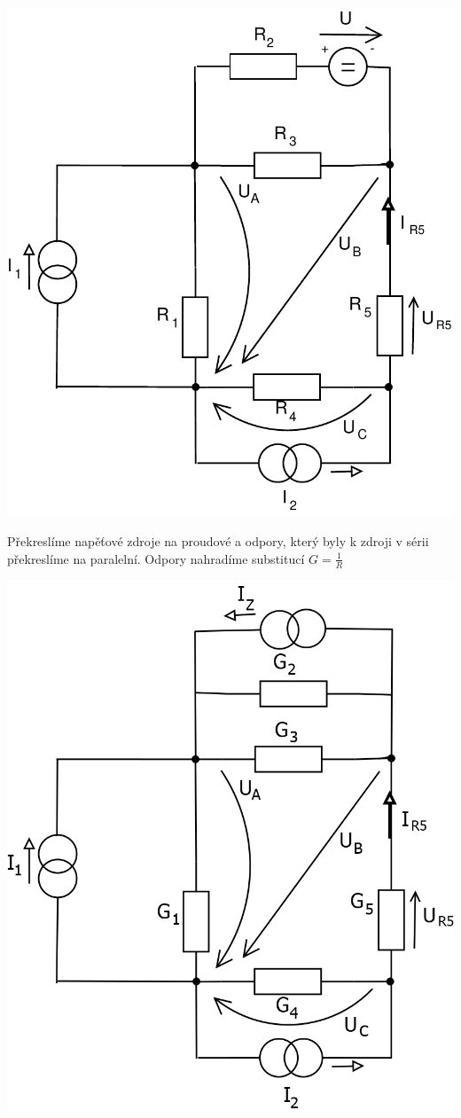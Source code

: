 \documentclass{article}
\begin{document}
\begin{large}
\begin{center}
    \includegraphics[scale=0.6]{Pr3/Pr3_2017.pdf}
\end{center}
    Překreslíme napěťové zdroje na proudové a odpory, který byly k zdroji v sérii překreslíme na paralelní.
    Odpory nahradíme substitucí $G=\frac{1}{R}$
\begin{center}
    \includegraphics[scale=0.3]{Pr3/Pr3_2.png}

\end{center}
\end{large}
\end{document}
